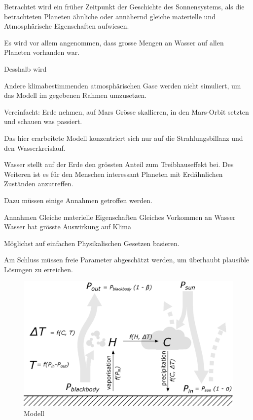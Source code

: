\begin{refsection}
	Betrachtet wird ein früher Zeitpunkt der Geschichte des Sonnensystems, als die betrachteten Planeten ähnliche oder annähernd gleiche materielle und Atmosphärische Eigenschaften aufwiesen.
	
	Es wird vor allem angenommen, dass grosse Mengen an Wasser auf allen Planeten vorhanden war.
	
	Desshalb wird 
	
	Andere klimabestimmenden atmosphärischen Gase werden nicht simuliert, um das Modell im gegebenen Rahmen umzusetzen.

	
	Vereinfacht: Erde nehmen, auf Mars Grösse skallieren, in den Mars-Orbit setzten und schauen was passiert. 
	

Das hier erarbeitete Modell konzentriert sich nur auf die Strahlungsbillanz und den Wasserkreislauf.

Wasser stellt auf der Erde den grössten Anteil zum Treibhauseffekt bei.
Des Weiteren ist es für den Menschen interessant Planeten mit Erdähnlichen Zuständen anzutreffen.



 Dazu müssen einige Annahmen getroffen werden.	
	
	Annahmen
		Gleiche materielle Eigenschaften
		Gleiches Vorkommen an Wasser
		Wasser hat grösste Auswirkung auf Klima
	
	
Möglichst auf einfachen Physikalischen Gesetzen basieren.	
	
	
Am Schluss müssen freie Parameter abgeschätzt werden, um überhaubt plausible Lösungen zu erreichen.


\begin{figure}
	\centering
	\includegraphics[width=\textwidth]{Pictures/Model.eps}
	\caption{Modell}
\end{figure}


\end{refsection}

